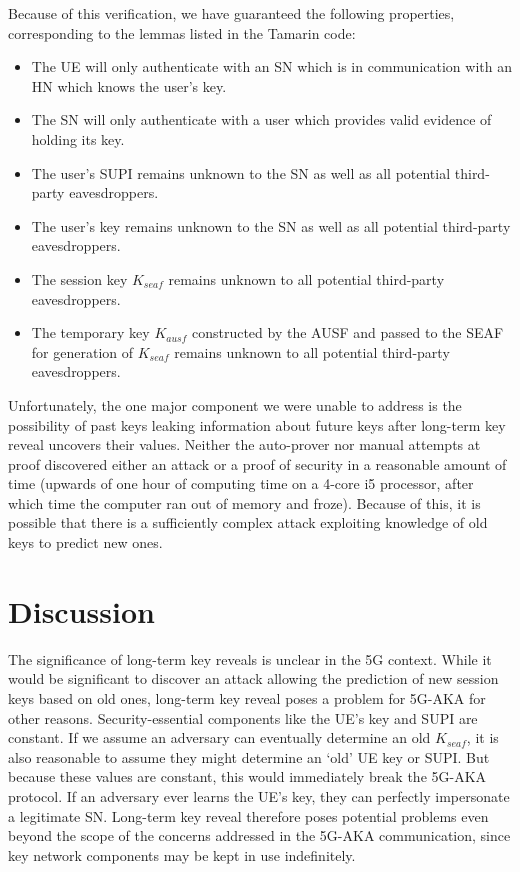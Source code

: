 \documentclass[10pt, pdftex]{article}
\begin{document}
Because of this verification, we have guaranteed the following properties, corresponding to the lemmas listed in the Tamarin code:

\begin{itemize}
 \item The UE will only authenticate with an SN which is in communication with an HN which knows the user's key.
 \item The SN will only authenticate with a user which provides valid evidence of holding its key.
 \item The user's SUPI remains unknown to the SN as well as all potential third-party eavesdroppers.
 \item The user's key remains unknown to the SN as well as all potential third-party eavesdroppers.
 \item The session key $K_{seaf}$ remains unknown to all potential third-party eavesdroppers.
 \item The temporary key $K_{ausf}$ constructed by the AUSF and passed to the SEAF for generation of $K_{seaf}$ remains unknown to all potential third-party eavesdroppers.
\end{itemize}

Unfortunately, the one major component we were unable to address is the possibility of past keys leaking information about future keys after long-term key reveal uncovers their values. Neither the auto-prover nor manual attempts at proof discovered either an attack or a proof of security in a reasonable amount of time (upwards of one hour of computing time on a 4-core i5 processor, after which time the computer ran out of memory and froze). Because of this, it is possible that there is a sufficiently complex attack exploiting knowledge of old keys to predict new ones.

\section{Discussion}

The significance of long-term key reveals is unclear in the 5G context. While it would be significant to discover an attack allowing the prediction of new session keys based on old ones, long-term key reveal poses a problem for 5G-AKA for other reasons. Security-essential components like the UE's key and SUPI are constant. If we assume an adversary can eventually determine an old $K_{seaf}$, it is also reasonable to assume they might determine an `old' UE key or SUPI. But because these values are constant, this would immediately break the 5G-AKA protocol. If an adversary ever learns the UE's key, they can perfectly impersonate a legitimate SN. Long-term key reveal therefore poses potential problems even beyond the scope of the concerns addressed in the 5G-AKA communication, since key network components may be kept in use indefinitely.
\end{document}
